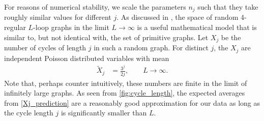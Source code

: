 \documentclass[11pt]{scrartcl}
\numberwithin{equation}{section}
\begin{document}
For reasons of numerical stability, we scale the parameters $n_j$ such that they take roughly similar values for different $j$. 
As discussed in \cite{balduf_statistics_2023}, the space of random 4-regular $L$-loop graphs in the limit $L \rightarrow\infty$ is a useful mathematical model that is similar to, but not identical with, the set of primitive graphs. Let $X_j$ be the number of cycles of length $j$ in such a random graph. For distinct $j$, the $X_j$ are  independent Poisson distributed variables with mean  \cite{bollobas_probabilistic_1980,mckay_short_2004}
\begin{align}\label{Xj_prediction}
	\tilde   X_j   &= \frac{3^j}{2j}, \qquad L \rightarrow \infty. 
\end{align}
Note that, perhaps counter intuitively, these numbers are finite in the limit of  infinitely large graphs.  As seen from \cref{fig:cycle_length}, the expected averages from \cref{Xj_prediction} are a reasonably  good approximation for our data as long as the cycle length $j$ is significantly smaller than $L$.
\end{document}
